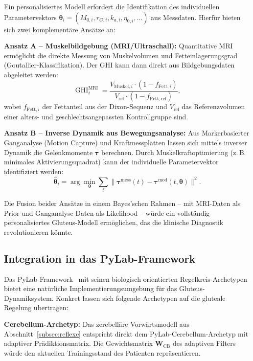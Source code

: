 ﻿\documentclass[12pt,a4paper]{report}
\theoremstyle{plain}
\theoremstyle{definition}
\theoremstyle{remark}
\DeclareMathOperator{\GHI}{GHI}
\begin{document}
	Ein personalisiertes Modell erfordert die Identifikation des individuellen
	Parametervektors $\boldsymbol{\theta}_i = (M_{0,i}, r_{G,i}, k_{a,i}, \eta_{0,i}, \ldots)$
	aus Messdaten. Hierfür bieten sich zwei komplementäre Ansätze an:
	
	\textbf{Ansatz A -- Muskelbildgebung (MRI/Ultraschall):}
	Quantitative MRI ermöglicht die direkte Messung von Muskelvolumen und
	Fetteinlagerungsgrad (Goutallier-Klassifikation). Der GHI kann dann
	direkt aus Bildgebungsdaten abgeleitet werden:
	\[
	\GHI_i^{\mathrm{MRI}} = \frac{V_{\mathrm{Muskel},i} \cdot (1 - f_{\mathrm{Fett},i})}{V_{\mathrm{ref}} \cdot (1 - f_{\mathrm{Fett,ref}})},
	\]
	wobei $f_{\mathrm{Fett},i}$ der Fettanteil aus der Dixon-Sequenz und
	$V_{\mathrm{ref}}$ das Referenzvolumen einer alters- und geschlechtsangepassten
	Kontrollgruppe sind.
	
	\textbf{Ansatz B -- Inverse Dynamik aus Bewegungsanalyse:}
	Aus Markerbasierter Ganganalyse (Motion Capture) und Kraftmessplatten
	lassen sich mittels inverser Dynamik die Gelenkmomente $\boldsymbol{\tau}$
	berechnen. Durch Muskelkraftoptimierung (z.\,B. minimales Aktivierungsquadrat)
	kann der individuelle Parametervektor identifiziert werden:
	\[
	\hat{\boldsymbol{\theta}}_i = \arg\min_{\boldsymbol{\theta}}
	\sum_{t} \|\boldsymbol{\tau}^{\mathrm{mess}}(t) - \boldsymbol{\tau}^{\mathrm{mod}}(t, \boldsymbol{\theta})\|^2.
	\]
	
	Die Fusion beider Ansätze in einem Bayes'schen Rahmen --
	mit MRI-Daten als Prior und Ganganalyse-Daten als Likelihood --
	würde ein vollständig personalisiertes Gluteus-Modell ermöglichen,
	das die klinische Diagnostik revolutionieren könnte.
	
	\subsection{Integration in das PyLab-Framework}
	\label{subsec:pylab}
	
	Das PyLab-Framework~\cite{epp2026wolke} mit seinen biologisch orientierten
	Regelkreis-Archetypen bietet eine natürliche Implementierungsumgebung
	für das Gluteus-Dynamiksystem. Konkret lassen sich folgende Archetypen
	auf die gluteale Regelung übertragen:
	
	\textbf{Cerebellum-Archetyp:}
	Das zerebelläre Vorwärtsmodell aus Abschnitt~\ref{subsec:reflexe}
	entspricht direkt dem PyLab-Cerebellum-Archetyp mit adaptiver Prädiktionsmatrix.
	Die Gewichtsmatrix $\mathbf{W}_{\mathrm{CB}}$ des adaptiven Filters
	würde den aktuellen Trainingsstand des Patienten repräsentieren.
	
\end{document}
